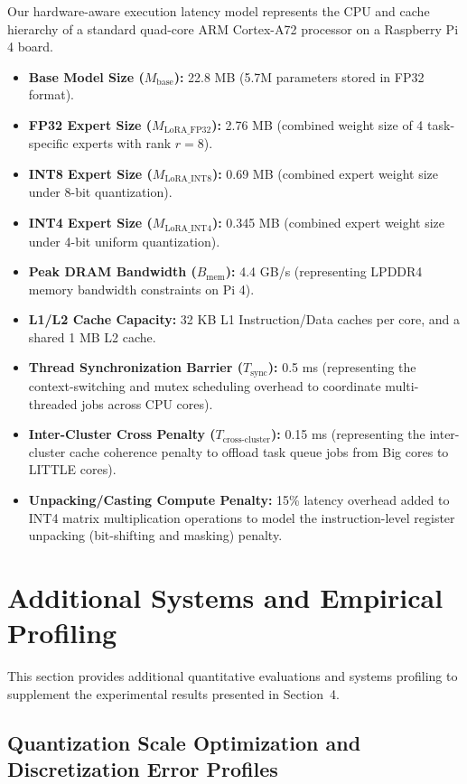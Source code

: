 Our hardware-aware execution latency model represents the CPU and cache hierarchy of a standard quad-core ARM Cortex-A72 processor on a Raspberry Pi 4 board.
\begin{itemize}
    \item \textbf{Base Model Size ($M_{\text{base}}$):} 22.8 MB (5.7M parameters stored in FP32 format).
    \item \textbf{FP32 Expert Size ($M_{\text{LoRA\_FP32}}$):} 2.76 MB (combined weight size of 4 task-specific experts with rank $r=8$).
    \item \textbf{INT8 Expert Size ($M_{\text{LoRA\_INT8}}$):} 0.69 MB (combined expert weight size under 8-bit quantization).
    \item \textbf{INT4 Expert Size ($M_{\text{LoRA\_INT4}}$):} 0.345 MB (combined expert weight size under 4-bit uniform quantization).
    \item \textbf{Peak DRAM Bandwidth ($B_{\text{mem}}$):} 4.4 GB/s (representing LPDDR4 memory bandwidth constraints on Pi 4).
    \item \textbf{L1/L2 Cache Capacity:} 32 KB L1 Instruction/Data caches per core, and a shared 1 MB L2 cache.
    \item \textbf{Thread Synchronization Barrier ($T_{\text{sync}}$):} 0.5 ms (representing the context-switching and mutex scheduling overhead to coordinate multi-threaded jobs across CPU cores).
    \item \textbf{Inter-Cluster Cross Penalty ($T_{\text{cross-cluster}}$):} 0.15 ms (representing the inter-cluster cache coherence penalty to offload task queue jobs from Big cores to LITTLE cores).
    \item \textbf{Unpacking/Casting Compute Penalty:} 15\% latency overhead added to INT4 matrix multiplication operations to model the instruction-level register unpacking (bit-shifting and masking) penalty.
\end{itemize}

\section{Additional Systems and Empirical Profiling}
\label{sec:appendix_additional_results}

This section provides additional quantitative evaluations and systems profiling to supplement the experimental results presented in Section~4.

\subsection{Quantization Scale Optimization and Discretization Error Profiles}
\label{sec:appendix_discretization_profiles}

